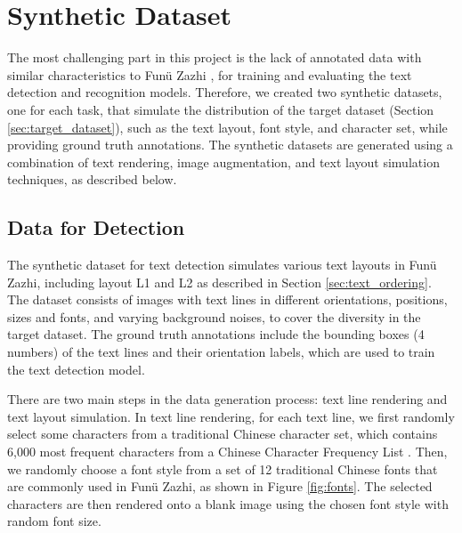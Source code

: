 \documentclass[12pt,twoside]{report}
\begin{document}
\section{Synthetic Dataset}
\label{sec:synthetic_dataset}
The most challenging part in this project is the lack of annotated data with similar characteristics to Funü Zazhi \cite{fnzzpages}, for training and evaluating the text detection and recognition models. Therefore, we created two synthetic datasets, one for each task, that simulate the distribution of the target dataset (Section \ref{sec:target_dataset}), such as the text layout, font style, and character set, while providing ground truth annotations. The synthetic datasets are generated using a combination of text rendering, image augmentation, and text layout simulation techniques, as described below.

\subsection{Data for Detection}
\label{sec:synthetic_detection}
The synthetic dataset for text detection simulates various text layouts in Funü Zazhi, including layout L1 and L2 as described in Section \ref{sec:text_ordering}. The dataset consists of images with text lines in different orientations, positions, sizes and fonts, and varying background noises, to cover the diversity in the target dataset. The ground truth annotations include the bounding boxes (4 numbers) of the text lines and their orientation labels, which are used to train the text detection model.

There are two main steps in the data generation process: text line rendering and text layout simulation. In text line rendering, for each text line, we first randomly select some characters from a traditional Chinese character set, which contains 6,000 most frequent characters from a Chinese Character Frequency List \cite{charlist}. Then, we randomly choose a font style from a set of 12 traditional Chinese fonts that are commonly used in Funü Zazhi, as shown in Figure \ref{fig:fonts}. The selected characters are then rendered onto a blank image using the chosen font style with random font size.
\end{document}
